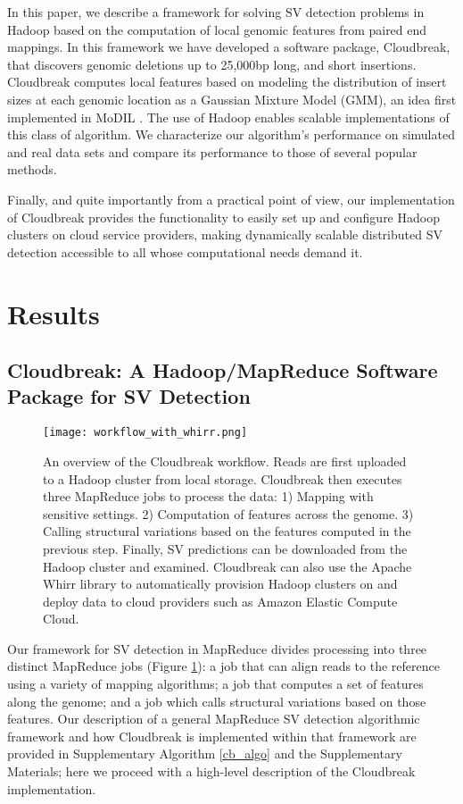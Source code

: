 \documentclass[11pt]{article}
\begin{document}
In this paper, we describe a framework for solving SV detection problems in Hadoop based on the computation of local genomic features from paired end mappings. In this framework we have developed a software package, Cloudbreak, that discovers genomic deletions up to 25,000bp long, and short insertions. Cloudbreak computes local features based on modeling the distribution of insert sizes at each genomic location as a Gaussian Mixture Model (GMM), an idea first implemented in MoDIL \autocite{Lee:2009da}. The use of Hadoop enables scalable implementations of this class of algorithm. We characterize our algorithm's performance on simulated and real data sets and compare its performance to those of several popular methods. 

Finally, and quite importantly from a practical point of view, our implementation of Cloudbreak provides the functionality to easily set up and configure Hadoop clusters on cloud service providers, making dynamically scalable distributed SV detection accessible to all whose computational needs demand it.

\section{Results}

\subsection{Cloudbreak: A Hadoop/MapReduce Software Package for SV Detection}

\begin{figure}
\centering
\texttt{[image: workflow\_with\_whirr.png]}
\caption{An overview of the Cloudbreak workflow. Reads are first uploaded to a Hadoop cluster from local storage. Cloudbreak then executes three MapReduce jobs to process the data: 1) Mapping with sensitive settings. 2) Computation of features across the genome. 3) Calling structural variations based on the features computed in the previous step. Finally, SV predictions can be downloaded from the Hadoop cluster and examined. Cloudbreak can also use the Apache Whirr library to automatically provision Hadoop clusters on and deploy data to cloud providers such as Amazon Elastic Compute Cloud.}
\label{cloudbreak_workflow}
\end{figure}

Our framework for SV detection in MapReduce divides processing into three distinct MapReduce jobs (Figure \ref{cloudbreak_workflow}): a job that can align reads to the reference using a variety of mapping algorithms; a job that computes a set of features along the genome; and a job which calls structural variations based on those features. Our description of a general MapReduce SV detection algorithmic framework and how Cloudbreak is implemented within that framework are provided in Supplementary Algorithm \ref{cb_algo} and the Supplementary Materials; here we proceed with a high-level description of the Cloudbreak implementation.
\end{document}
